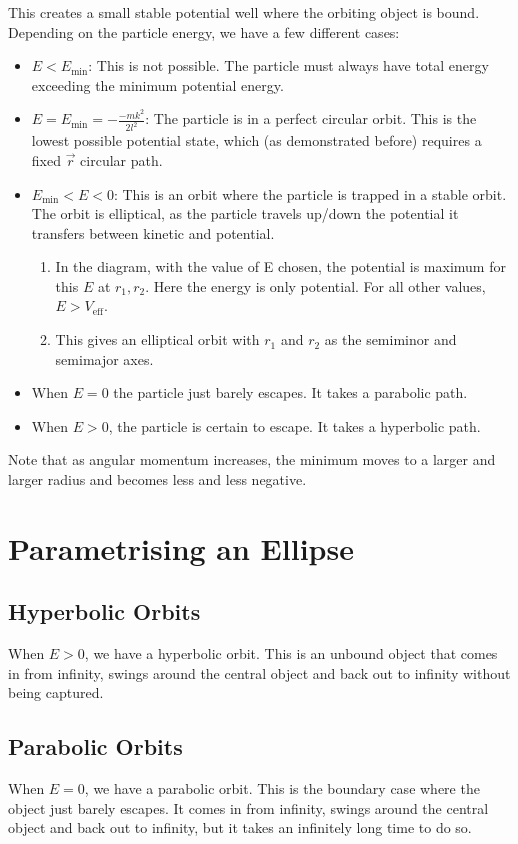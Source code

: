 This creates a small stable potential well where the orbiting object is bound. Depending on the particle energy, we have a few different cases:
\begin{itemize}
    \item $E < E_\text{min}$: This is not possible. The particle must always have total energy exceeding the minimum potential energy.
    \item $E = E_\text{min} = - \frac{-mk^2}{2l^2}$: The particle is in a perfect circular orbit. This is the lowest possible potential state, which (as demonstrated before) requires a fixed $\vec{r}$ circular path.
    \item $E_\text{min} < E < 0$: This is an orbit where the particle is trapped in a stable orbit. The orbit is elliptical, as the particle travels up/down the potential it transfers between kinetic and potential.
    
    \begin{enumerate}
        \item In the diagram, with the value of E chosen, the potential is maximum for this $E$ at $r_1, r_2$. Here the energy is only potential. For all other values, $E > V_\text{eff}$.
        \item This gives an elliptical orbit with $r_1$ and $r_2$ as the semiminor and semimajor axes.
    \end{enumerate}
    \item When $E = 0$ the particle just barely escapes. It takes a parabolic path.
    \item When $E > 0$, the particle is certain to escape. It takes a hyperbolic path.

\end{itemize}

Note that as angular momentum increases, the minimum moves to a larger and larger radius and becomes less and less negative.

\section{Parametrising an Ellipse}
\subsection{Hyperbolic Orbits}
When $E > 0$, we have a hyperbolic orbit. This is an unbound object that comes in from infinity, swings around the central object and back out to infinity without being captured.

\subsection{Parabolic Orbits}
When $E = 0$, we have a parabolic orbit. This is the boundary case where the object just barely escapes. It comes in from infinity, swings around the central object and back out to infinity, but it takes an infinitely long time to do so.

